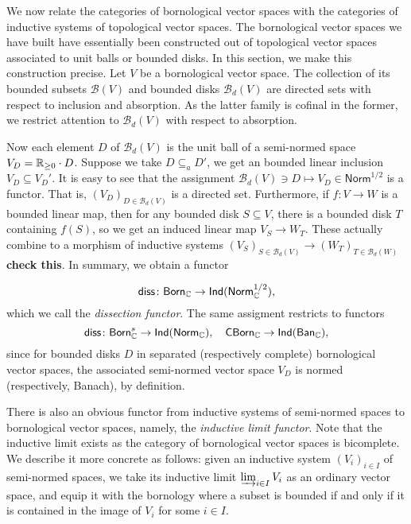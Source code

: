 We now relate the categories of bornological vector spaces with the categories of inductive systems of topological vector spaces. The bornological vector spaces we have built have essentially been constructed out of topological vector spaces associated to unit balls or bounded disks. In this section, we make this construction precise. Let \(V\) be a bornological vector space. The collection of its bounded subsets \(\mathcal{B}(V)\) and bounded disks \(\mathcal{B}_d(V)\) are directed sets with respect to inclusion and absorption. As the latter family is cofinal in the former, we restrict attention to \(\mathcal{B}_d(V)\) with respect to absorption. 

Now each element \(D\) of \(\mathcal{B}_d(V)\) is the unit ball of a semi-normed space \(V_D = \mathbb R_{\geq 0} \cdot D\). Suppose we take \(D \subseteq_a D'\), we get an bounded linear inclusion \(V_D \subseteq V_D'\). It is easy to see that the assignment \(\mathcal{B}_d(V) \ni D \mapsto V_D \in \mathsf{Norm}^{1/2}\) is a functor. That is, \((V_D)_{D \in \mathcal{B}_d(V)}\) is a directed set. Furthermore, if \(f \colon V \to W\) is a bounded linear map, then for any bounded disk \(S\subseteq V\), there is a bounded disk \(T\) containing \(f(S)\), so we get an induced linear map \(V_S \to W_T\). These actually combine to a morphism of inductive systems \((V_S)_{S \in \mathcal{B}_d(V)} \to (W_T)_{T \in \mathcal{B}_d(W)}\) \textbf{check this}. In summary, we obtain a functor 

\[\mathsf{diss} \colon \mathsf{Born}_\mathbb C \to \mathsf{Ind}(\mathsf{Norm}_{\mathbb C}^{1/2}),\] which we call the \textit{dissection functor}. The same assigment restricts to functors \[\mathsf{diss} \colon \mathsf{Born}_\mathbb C^s \to \mathsf{Ind}(\mathsf{Norm}_\mathbb C), \quad \mathsf{CBorn}_\mathbb C \to \mathsf{Ind}(\mathsf{Ban}_\mathbb C),\] since for bounded disks \(D\) in separated (respectively complete) bornological vector spaces, the associated semi-normed vector space \(V_D\) is normed (respectively, Banach), by definition.


There is also an obvious functor from inductive systems of semi-normed spaces to bornological vector spaces, namely, the \textit{inductive limit functor}. Note that the inductive limit exists as the category of bornological vector spaces is bicomplete. We describe it more concrete as follows: given an inductive system \((V_i)_{i \in I}\) of semi-normed spaces, we take its inductive limit \(\varinjlim_{i \in I} V_i\) as an ordinary vector space, and equip it with the bornology where a subset is bounded if and only if it is contained in the image of \(V_i\) for some \(i \in I\). 

